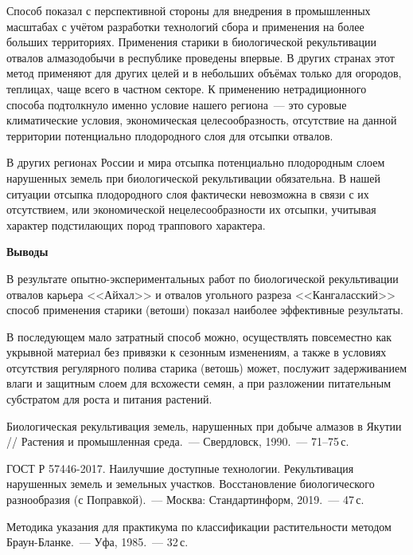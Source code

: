 Способ показал с перспективной стороны для внедрения в промышленных масштабах с учётом разработки технологий сбора и применения на более больших территориях. Применения старики в биологической рекультивации отвалов алмазодобычи в республике проведены впервые. В других странах этот метод применяют для других целей и в небольших объёмах только для огородов, теплицах, чаще всего в частном секторе. К применению нетрадиционного способа подтолкнуло именно условие нашего региона~--- это суровые климатические условия, экономическая целесообразность, отсутствие на данной территории потенциально плодородного слоя для отсыпки отвалов.

В других регионах России и мира отсыпка потенциально плодородным слоем нарушенных земель при биологической рекультивации обязательна. В нашей ситуации отсыпка плодородного слоя фактически невозможна в связи с их отсутствием, или экономической нецелесообразности их отсыпки, учитывая характер подстилающих пород траппового характера.

\textbf{Выводы}

В результате опытно-экспериментальных работ по биологической рекультивации отвалов карьера <<Айхал>> и отвалов угольного разреза <<Кангаласский>> способ применения старики (ветоши) показал наиболее эффективные результаты.

В последующем мало затратный способ можно, осуществлять повсеместно как укрывной материал без привязки к сезонным изменениям, а также в условиях отсутствия регулярного полива старика (ветошь) может, послужит задерживанием влаги и защитным слоем для всхожести семян, а при разложении питательным субстратом для роста и питания растений.

\begin{thebibliography}{99}

\bibitem{}
 Биологическая рекультивация земель, нарушенных при добыче алмазов в Якутии // Растения и промышленная среда.~--- Свердловск, 1990.~--- 71--75\,с.

\bibitem{}
ГОСТ Р 57446-2017. Наилучшие доступные технологии. Рекультивация нарушенных земель и земельных участков. Восстановление биологического разнообразия (с Поправкой).~--- Москва: Стандартинформ, 2019.~--- 47\,с.

\bibitem{}
 Методика указания для практикума по классификации растительности методом Браун-Бланке.~--- Уфа, 1985.~--- 32\,с.
\end{thebibliography}
